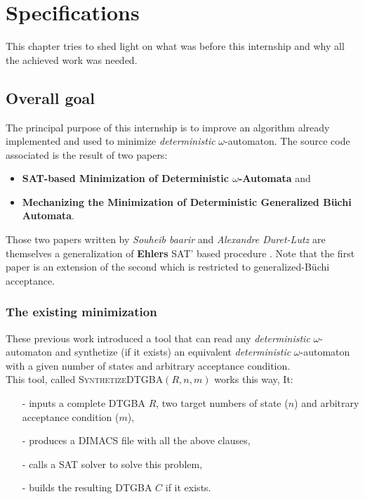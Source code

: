 \chapter{Specifications}

This chapter tries to shed light on what was before this internship and why all the achieved work was
needed.

\section{Overall goal}
The principal purpose of this internship is to improve an algorithm already implemented and used to
minimize \textit{deterministic} $\omega$-automaton. The source code associated is the result of two papers:
\begin{itemize}
 \item \textbf{SAT-based Minimization of Deterministic $\omega$-Automata}\cite{15} and
 \item \textbf{Mechanizing the Minimization of Deterministic Generalized Büchi Automata}\cite{14}.
\end{itemize}

Those two papers written by \textit{Souheib baarir} and \textit{Alexandre Duret-Lutz} are themselves a
generalization of \textbf{Ehlers} SAT' based procedure \cite{17}. Note that the first paper\cite{15} is an
extension of the second\cite{14} which is restricted to generalized-Büchi acceptance.

\subsection{The existing minimization}
These previous work introduced a tool that can read any \textit{deterministic} $\omega$-automaton and
synthetize (if it exists) an equivalent \textit{deterministic} $\omega$-automaton with a given number
of states and arbitrary acceptance condition.\\

\noindent This tool, called \textsc{Synthetize}DTGBA$(R,n,m)$ works this way, It:
\begin{itemize}
 \item[-] inputs a complete DTGBA $R$, two target numbers of state ($n$) and arbitrary acceptance condition
          ($m$),
 \item[-] produces a DIMACS file \cite{18} with all the above clauses,
 \item[-] calls a SAT solver to solve this problem,
 \item[-] builds the resulting DTGBA $C$ if it exists.
\end{itemize}

